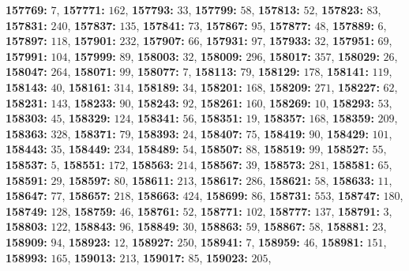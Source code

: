 \textsf{\bfseries 157769:} $7$, \textsf{\bfseries 157771:} $162$, \textsf{\bfseries 157793:} $33$, \textsf{\bfseries 157799:} $58$, \textsf{\bfseries 157813:} $52$, \textsf{\bfseries 157823:} $83$, \textsf{\bfseries 157831:} $240$, \textsf{\bfseries 157837:} $135$, \textsf{\bfseries 157841:} $73$, \textsf{\bfseries 157867:} $95$, \textsf{\bfseries 157877:} $48$, \textsf{\bfseries 157889:} $6$, \textsf{\bfseries 157897:} $118$, \textsf{\bfseries 157901:} $232$, \textsf{\bfseries 157907:} $66$, \textsf{\bfseries 157931:} $97$, \textsf{\bfseries 157933:} $32$, \textsf{\bfseries 157951:} $69$, \textsf{\bfseries 157991:} $104$, \textsf{\bfseries 157999:} $89$, \textsf{\bfseries 158003:} $32$, \textsf{\bfseries 158009:} $296$, \textsf{\bfseries 158017:} $357$, \textsf{\bfseries 158029:} $26$, \textsf{\bfseries 158047:} $264$, \textsf{\bfseries 158071:} $99$, \textsf{\bfseries 158077:} $7$, \textsf{\bfseries 158113:} $79$, \textsf{\bfseries 158129:} $178$, \textsf{\bfseries 158141:} $119$, \textsf{\bfseries 158143:} $40$, \textsf{\bfseries 158161:} $314$, \textsf{\bfseries 158189:} $34$, \textsf{\bfseries 158201:} $168$, \textsf{\bfseries 158209:} $271$, \textsf{\bfseries 158227:} $62$, \textsf{\bfseries 158231:} $143$, \textsf{\bfseries 158233:} $90$, \textsf{\bfseries 158243:} $92$, \textsf{\bfseries 158261:} $160$, \textsf{\bfseries 158269:} $10$, \textsf{\bfseries 158293:} $53$, \textsf{\bfseries 158303:} $45$, \textsf{\bfseries 158329:} $124$, \textsf{\bfseries 158341:} $56$, \textsf{\bfseries 158351:} $19$, \textsf{\bfseries 158357:} $168$, \textsf{\bfseries 158359:} $209$, \textsf{\bfseries 158363:} $328$, \textsf{\bfseries 158371:} $79$, \textsf{\bfseries 158393:} $24$, \textsf{\bfseries 158407:} $75$, \textsf{\bfseries 158419:} $90$, \textsf{\bfseries 158429:} $101$, \textsf{\bfseries 158443:} $35$, \textsf{\bfseries 158449:} $234$, \textsf{\bfseries 158489:} $54$, \textsf{\bfseries 158507:} $88$, \textsf{\bfseries 158519:} $99$, \textsf{\bfseries 158527:} $55$, \textsf{\bfseries 158537:} $5$, \textsf{\bfseries 158551:} $172$, \textsf{\bfseries 158563:} $214$, \textsf{\bfseries 158567:} $39$, \textsf{\bfseries 158573:} $281$, \textsf{\bfseries 158581:} $65$, \textsf{\bfseries 158591:} $29$, \textsf{\bfseries 158597:} $80$, \textsf{\bfseries 158611:} $213$, \textsf{\bfseries 158617:} $286$, \textsf{\bfseries 158621:} $58$, \textsf{\bfseries 158633:} $11$, \textsf{\bfseries 158647:} $77$, \textsf{\bfseries 158657:} $218$, \textsf{\bfseries 158663:} $424$, \textsf{\bfseries 158699:} $86$, \textsf{\bfseries 158731:} $553$, \textsf{\bfseries 158747:} $180$, \textsf{\bfseries 158749:} $128$, \textsf{\bfseries 158759:} $46$, \textsf{\bfseries 158761:} $52$, \textsf{\bfseries 158771:} $102$, \textsf{\bfseries 158777:} $137$, \textsf{\bfseries 158791:} $3$, \textsf{\bfseries 158803:} $122$, \textsf{\bfseries 158843:} $96$, \textsf{\bfseries 158849:} $30$, \textsf{\bfseries 158863:} $59$, \textsf{\bfseries 158867:} $58$, \textsf{\bfseries 158881:} $23$, \textsf{\bfseries 158909:} $94$, \textsf{\bfseries 158923:} $12$, \textsf{\bfseries 158927:} $250$, \textsf{\bfseries 158941:} $7$, \textsf{\bfseries 158959:} $46$, \textsf{\bfseries 158981:} $151$, \textsf{\bfseries 158993:} $165$, \textsf{\bfseries 159013:} $213$, \textsf{\bfseries 159017:} $85$, \textsf{\bfseries 159023:} $205$, 
